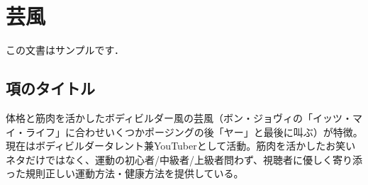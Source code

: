 \section{芸風}
この文書はサンプルです．


\subsection{項のタイトル}
体格と筋肉を活かしたボディビルダー風の芸風（ボン・ジョヴィの「イッツ・マイ・ライフ」に合わせいくつかポージングの後「ヤー」と最後に叫ぶ）が特徴。
現在はボディビルダータレント兼YouTuberとして活動。筋肉を活かしたお笑いネタだけではなく、運動の初心者/中級者/上級者問わず、視聴者に優しく寄り添った規則正しい運動方法・健康方法を提供している。